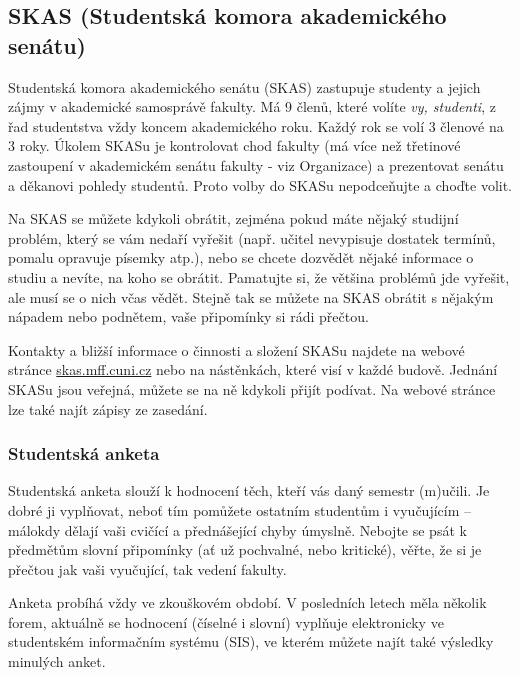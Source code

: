 \subsection[Studentská komora AS]{SKAS (Studentská komora akademického senátu)}
Studentská komora akademického senátu (SKAS) zastupuje studenty a jejich zájmy v
akademické samosprávě fakulty. Má 9 členů, které volíte \textit{vy, studenti}, z
řad studentstva vždy koncem akademického roku. Každý rok se volí 3 členové na 3
roky. Úkolem SKASu je kontrolovat chod fakulty (má více než třetinové zastoupení
v akademickém senátu fakulty - viz Organizace) a prezentovat senátu a děkanovi
pohledy studentů. Proto volby do SKASu nepodceňujte a choďte volit.

Na SKAS se můžete kdykoli obrátit, zejména pokud máte nějaký studijní problém,
který se vám nedaří vyřešit (např. učitel nevypisuje dostatek termínů, pomalu
opravuje písemky atp.), nebo se chcete dozvědět nějaké informace o studiu a
nevíte, na koho se obrátit. Pamatujte si, že většina problémů jde vyřešit, ale
musí se o nich včas vědět. Stejně tak se můžete na SKAS obrátit s nějakým
nápadem nebo podnětem, vaše připomínky si rádi přečtou.

Kontakty a bližší informace o činnosti a složení SKASu najdete na webové stránce
\url{skas.mff.cuni.cz} nebo na nástěnkách, které visí v každé budově. Jednání
SKASu jsou veřejná, můžete se na ně kdykoli přijít podívat. Na webové stránce
lze také najít zápisy ze zasedání.


\subsubsection{Studentská anketa}
Studentská anketa slouží k hodnocení těch, kteří vás daný semestr (m)učili. Je
dobré ji vyplňovat, neboť tím pomůžete ostatním studentům i vyučujícím – málokdy
dělají vaši cvičící a přednášející chyby úmyslně. Nebojte se psát k předmětům
slovní připomínky (ať už pochvalné, nebo kritické), věřte, že si je přečtou jak
vaši vyučující, tak vedení fakulty.

Anketa probíhá vždy ve zkouškovém období. V posledních letech měla několik
forem, aktuálně se hodnocení (číselné i slovní) vyplňuje elektronicky ve
studentském informačním systému (SIS), ve kterém můžete najít také výsledky
minulých anket.